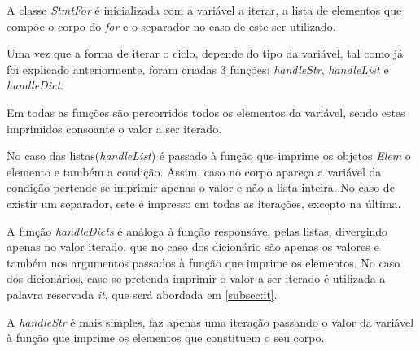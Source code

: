 \documentclass[../relatorio.tex]{subfiles}
\begin{document}
    A classe \textit{StmtFor} é inicializada com a variável a iterar, a lista
    de elementos que compõe o corpo do \textit{for} e o separador no caso de
    este ser utilizado.

    Uma vez que a forma de iterar o ciclo, depende do tipo da variável, tal como
    já foi explicado anteriormente, foram criadas 3 funções: \textit{handleStr},
    \textit{handleList} e \textit{handleDict}. 

    Em todas as funções são percorridos todos os elementos da variável, sendo estes imprimidos
    consoante o valor a ser iterado. 

    
    No caso das listas(\textit{handleList}) é passado à função que imprime os objetos \textit{Elem} o elemento e também a condição.
    Assim, caso no corpo apareça a variável da condição pertende-se imprimir
    apenas o valor e não a lista inteira. No caso de existir um separador, este é
    impresso em todas as iterações, excepto na última. 

    A função \textit{handleDicts} é análoga à função responsável pelas listas, divergindo
    apenas no valor iterado, que no caso dos dicionário são apenas os valores e também nos
    argumentos passados à função que imprime os elementos. No caso dos dicionários, caso se
    pretenda imprimir o valor a ser iterado é utilizada a palavra reservada \textit{it}, que
    será abordada em \ref{subsec:it}. 

    A \textit{handleStr} é mais simples, faz apenas uma iteração passando o valor da variável 
    à função que imprime os elementos que constituem o seu corpo.
\end{document}

